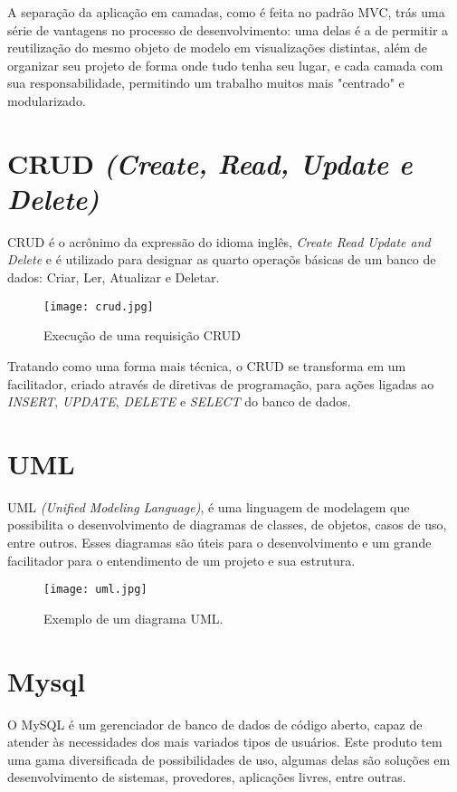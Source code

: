         A separação da aplicação em camadas, como é feita no padrão MVC, trás uma série de vantagens no processo de desenvolvimento: uma delas é a de permitir a reutilização do mesmo objeto de modelo em visualizações distintas, além de organizar seu projeto de forma onde tudo tenha seu lugar, e cada camada com sua responsabilidade, permitindo um trabalho muitos mais "centrado" e modularizado.


    \section{CRUD \emph{(Create, Read, Update e Delete)}\label{sec:crud}}
        CRUD é o acrônimo da expressão do idioma inglês, \emph{Create Read Update and Delete} e é utilizado para designar as quarto operaçõs básicas de um banco de dados: Criar, Ler, Atualizar e Deletar.
        \begin{figure}[!htb]
            \centering
            \texttt{[image: crud.jpg]}
            \caption{\small Execução de uma requisição CRUD}
            \label{cap:crud}
        \end{figure}

        Tratando como uma forma mais técnica, o CRUD se transforma em um facilitador, criado através de diretivas de programação, para ações ligadas ao \emph{INSERT}, \emph{UPDATE}, \emph{DELETE} e \emph{SELECT} do banco de dados.



    \section{UML\label{sec:uml}}
        UML \emph{(Unified Modeling Language)}, é uma linguagem de modelagem que possibilita o desenvolvimento de diagramas de classes, de objetos, casos de uso, entre outros. Esses diagramas são úteis para o desenvolvimento e um grande facilitador para o entendimento de um projeto e sua estrutura.

        \begin{figure}[!htb]
            \centering
            \texttt{[image: uml.jpg]}
            \caption{\small Exemplo de um diagrama UML.}
            \label{cap:uml}
        \end{figure}


    \section{Mysql\label{sec:mysql}}
        O MySQL é um gerenciador de banco de dados de código aberto, capaz de atender às necessidades dos mais variados tipos de usuários. Este produto tem uma gama diversificada de possibilidades de uso, algumas delas são soluções em desenvolvimento de sistemas, provedores, aplicações livres, entre outras.

